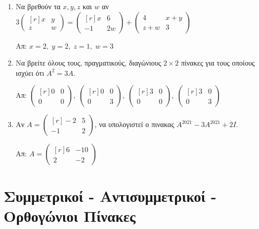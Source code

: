 \begin{enumerate}
\item Να βρεθούν τα $ x,y, z $ και $ w $ αν $ 3 
  \begin{pmatrix*}[r]
    x & y \\
    z &w
  \end{pmatrix*} = 
  \begin{pmatrix*}[r]
    x & 6 \\
    -1 & 2w
  \end{pmatrix*} + 
  \begin{pmatrix*}
    4 & x+y \\
    z+w & 3
  \end{pmatrix*} $ 

  \hfill Απ: $ x=2, \; y=2, \; z=1, \; w=3 $ 

\item Να βρείτε όλους τους, πραγματικούς, διαγώνιους $ 2 \times 2 $ πίνακες για τους 
  οποίους ισχύει ότι $ A^{2}=3A $.

  \hfill Απ: $\scriptstyle{ 
  \begin{pmatrix*}[r]
    0 & 0 \\
    0 &0
  \end{pmatrix*}, \; 
  \begin{pmatrix*}[r]
    0 & 0 \\
    0 & 3
  \end{pmatrix*}, \; 
  \begin{pmatrix*}[r]
    3 & 0 \\
    0 & 0
  \end{pmatrix*}, \; 
  \begin{pmatrix*}[r]
    3 & 0 \\
    0 & 3
\end{pmatrix*}} $
  

\item Αν $ A = 
  \begin{pmatrix*}[r]
    -2 & 5 \\
    -1 & 2
  \end{pmatrix*} $, να υπολογιστεί ο πινακας $ A^{2021} - 3A^{2021} +2I $. 

  \hfill Απ: $ A = 
  \begin{pmatrix*}[r]
    6 & -10 \\
    2 & -2
  \end{pmatrix*} $ 
\end{enumerate}

\section*{Συμμετρικοί - Αντισυμμετρικοί - Ορθογώνιοι Πίνακες}

